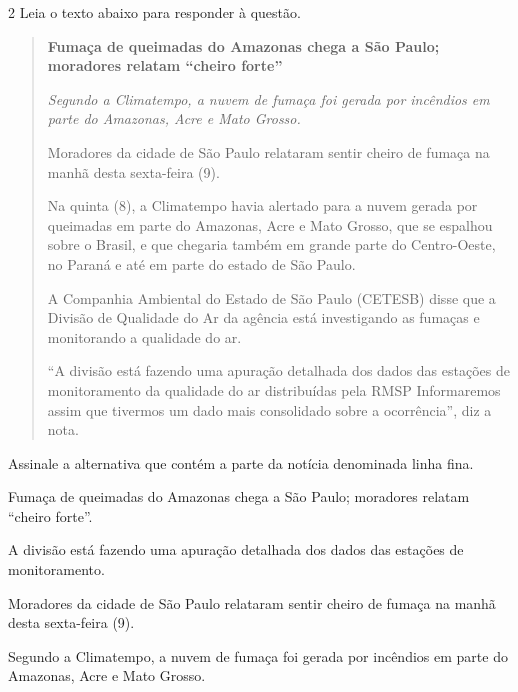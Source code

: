 \num{2} Leia o texto abaixo para responder à questão. 

\begin{quote}
\textbf{Fumaça de queimadas do Amazonas chega a São Paulo; moradores
relatam ``cheiro forte''}

\textit{Segundo a Climatempo, a nuvem de fumaça foi gerada por incêndios em
parte do Amazonas, Acre e Mato Grosso.}

Moradores da cidade de São Paulo relataram sentir cheiro de fumaça na
manhã desta sexta-feira (9).

Na quinta (8), a Climatempo havia alertado para a nuvem gerada por
queimadas em parte do Amazonas, Acre e Mato Grosso, que se espalhou sobre o
Brasil, e que chegaria também em grande parte do Centro-Oeste, no Paraná
e até em parte do estado de São Paulo.

A Companhia Ambiental do Estado de São Paulo (CETESB) disse que a
Divisão de Qualidade do Ar da agência está investigando as fumaças e
monitorando a qualidade do ar.

``A divisão está fazendo uma apuração detalhada dos dados das
estações de monitoramento da qualidade do ar distribuídas pela RMSP
Informaremos assim que tivermos um dado mais consolidado sobre a
ocorrência'', diz a nota.
\end{quote}


Assinale a alternativa que contém a parte da notícia denominada linha fina.

\begin{escolha}

\item Fumaça de queimadas do Amazonas chega a São Paulo; moradores relatam ``cheiro forte''.

\item A divisão está fazendo uma apuração detalhada dos dados das estações de monitoramento.

\item Moradores da cidade de São Paulo relataram sentir cheiro de fumaça na manhã desta sexta-feira (9).

\item Segundo a Climatempo, a nuvem de fumaça foi gerada por incêndios em parte do Amazonas, Acre e Mato Grosso.

\end{escolha}


